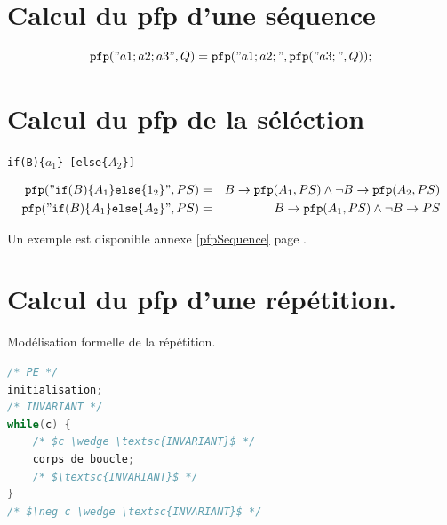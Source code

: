 \documentclass[12pt,a4paper,openany]{book}
\begin{document}
	\section{Calcul du pfp d'une séquence}
	$$\texttt{pfp}("a1;a2;a3", Q) = \texttt{pfp}("a1;a2;", \texttt{pfp}("a3;", Q));$$
	\section{Calcul du pfp de la séléction} \begin{center} \texttt{if(B)\{$a_1$\} [else\{$A_2$\}]}
	 \end{center}
\begin{eqnarray*}
	\texttt{pfp}("\texttt{if}(B)\{A_1\}\texttt{else}\{1_2\}", PS) &=&
	B \rightarrow \texttt{pfp}(A_1, PS) \wedge \neg B \rightarrow \texttt{pfp} (A_2, PS)\\
	\texttt{pfp}("\texttt{if}(B)\{A_1\}\texttt{else}\{A_2\}", PS) &=& B \rightarrow \texttt{pfp}(A_1, PS) \wedge \neg B \rightarrow PS 
\end{eqnarray*}

Un exemple est disponible annexe \ref{pfpSequence} page \pageref{pfpSequence}.

\section{Calcul du pfp d'une répétition.}
Modélisation formelle de la répétition.
\begin{lstlisting}[language=C]
/* PE */
initialisation;
/* INVARIANT */
while(c) {
	/* $c \wedge \textsc{INVARIANT}$ */
	corps de boucle;
	/* $\textsc{INVARIANT}$ */
}
/* $\neg c \wedge \textsc{INVARIANT}$ */
\end{lstlisting}
\end{document}
